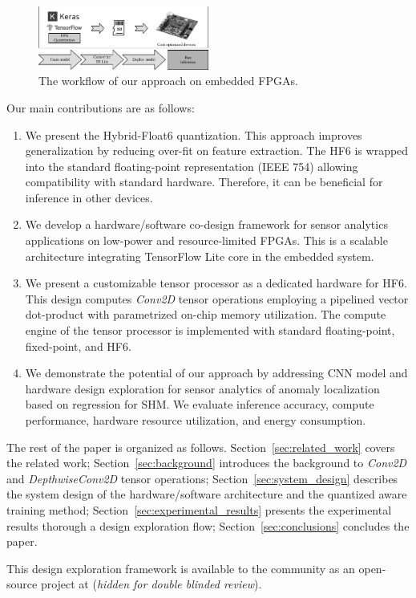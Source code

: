 \begin{figure}[t!]
	\centering
	\includegraphics[width=0.5\textwidth]{../figures/workflow.pdf}
	\caption{The workflow of our approach on embedded FPGAs.}
	\label{fig:workflow}
\end{figure}

Our main contributions are as follows:
\begin{enumerate}
	\item We present the Hybrid-Float6 quantization. This approach improves generalization by reducing over-fit on feature extraction. The HF6 is wrapped into the standard floating-point representation (IEEE 754) allowing compatibility with standard hardware. Therefore, it can be beneficial for inference in other devices.
	\item We develop a hardware/software co-design framework for sensor analytics applications on low-power and resource-limited FPGAs. This is a scalable architecture integrating TensorFlow Lite core in the embedded system.
	\item We present a customizable tensor processor as a dedicated hardware for HF6. This design computes \emph{Conv2D} tensor operations employing a pipelined vector dot-product with parametrized on-chip memory utilization. The compute engine of the tensor processor is implemented with standard floating-point, fixed-point, and HF6.
	\item We demonstrate the potential of our approach by addressing CNN model and hardware design exploration for sensor analytics of anomaly localization based on regression for SHM. We evaluate inference accuracy, compute performance, hardware resource utilization, and energy consumption.
\end{enumerate}

The rest of the paper is organized as follows. Section~\ref{sec:related_work} covers the related work; Section~\ref{sec:background} introduces the background to \emph{Conv2D} and \emph{DepthwiseConv2D} tensor operations; Section~\ref{sec:system_design} describes the system design of the hardware/software architecture and the quantized aware training method; Section~\ref{sec:experimental_results} presents the experimental results thorough a design exploration flow; Section~\ref{sec:conclusions} concludes the paper.

This design exploration framework is available to the community as an open-source project at (\emph{hidden for double blinded review}).